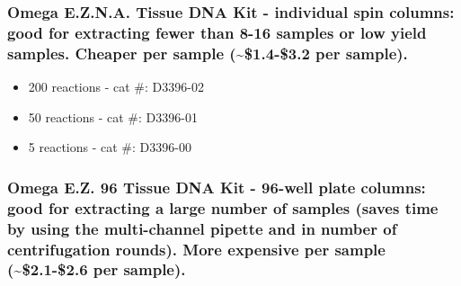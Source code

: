 \documentclass[
  letterpaper,
  DIV=11,
  numbers=noendperiod]{scrreprt}
\begin{document}
\hypertarget{omega-e.z.n.a.-tissue-dna-kit---individual-spin-columns-good-for-extracting-fewer-than-8-16-samples-or-low-yield-samples.-cheaper-per-sample-1.4-3.2-per-sample.}{%
\subsubsection*{\texorpdfstring{\textbf{Omega E.Z.N.A. Tissue DNA Kit -
individual spin columns: good for extracting fewer than 8-16 samples or
low yield samples. Cheaper per sample (\textasciitilde\$1.4-\$3.2 per
sample).}}{Omega E.Z.N.A. Tissue DNA Kit - individual spin columns: good for extracting fewer than 8-16 samples or low yield samples. Cheaper per sample (\textasciitilde\$1.4-\$3.2 per sample).}}\label{omega-e.z.n.a.-tissue-dna-kit---individual-spin-columns-good-for-extracting-fewer-than-8-16-samples-or-low-yield-samples.-cheaper-per-sample-1.4-3.2-per-sample.}}

\begin{itemize}
\item
  200 reactions - cat \#: D3396-02
\item
  50 reactions - cat \#: D3396-01
\item
  5 reactions - cat \#: D3396-00
\end{itemize}

\hypertarget{omega-e.z.-96-tissue-dna-kit---96-well-plate-columns-good-for-extracting-a-large-number-of-samples-saves-time-by-using-the-multi-channel-pipette-and-in-number-of-centrifugation-rounds.-more-expensive-per-sample-2.1-2.6-per-sample.}{%
\subsubsection*{\texorpdfstring{\textbf{Omega E.Z. 96 Tissue DNA Kit -
96-well plate columns: good for extracting a large number of samples
(saves time by using the multi-channel pipette and in number of
centrifugation rounds). More expensive per sample
(\textasciitilde\$2.1-\$2.6 per
sample).}}{Omega E.Z. 96 Tissue DNA Kit - 96-well plate columns: good for extracting a large number of samples (saves time by using the multi-channel pipette and in number of centrifugation rounds). More expensive per sample (\textasciitilde\$2.1-\$2.6 per sample).}}\label{omega-e.z.-96-tissue-dna-kit---96-well-plate-columns-good-for-extracting-a-large-number-of-samples-saves-time-by-using-the-multi-channel-pipette-and-in-number-of-centrifugation-rounds.-more-expensive-per-sample-2.1-2.6-per-sample.}}
\end{document}
